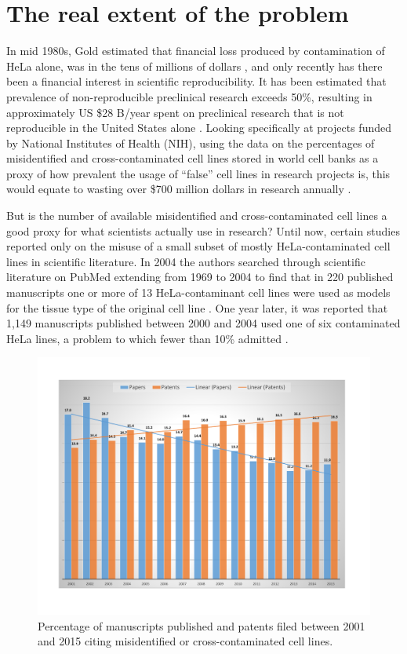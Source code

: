 \documentclass[12pt]{article}
\begin{document}
\section*{The real extent of the problem}

In mid 1980s, Gold estimated that financial loss produced by contamination of HeLa alone, was in the tens of millions of dollars \cite{gold1986conspiracy}, and only recently has there been a financial interest in scientific reproducibility. It has been estimated that prevalence of non-reproducible preclinical research exceeds 50\%, resulting in approximately US \$28 B/year spent on preclinical research that is not reproducible in the United States alone \cite{freedman2015economics}. Looking specifically at projects funded by National Institutes of Health (NIH), using the data on the percentages of misidentified and cross-contaminated cell lines stored in world cell banks as a proxy of how prevalent the usage of ``false'' cell lines in research projects is, this would equate to wasting over \$700 million dollars in research annually \cite{freedman2014culture, freedman2015economics}.

But is the number of available misidentified and cross-contaminated cell lines a good proxy for what scientists actually use in research? Until now, certain studies reported only on the misuse of a small subset of mostly HeLa-contaminated cell lines in scientific literature. In 2004 the authors searched through scientific literature on PubMed extending from 1969 to 2004 to find that in 220 published manuscripts one or more of 13 HeLa-contaminant cell lines were used as models for the tissue type of the original cell line \cite{buehring2004cell}. One year later, it was reported that 1,149 manuscripts published between 2000 and 2004 used one of six contaminated HeLa lines, a problem to which fewer than 10\% admitted \cite{masters2005dna}.

\begin{figure}[b!]
\centering
	\includegraphics[width=.75\textwidth]{Graph.pdf}
	\caption{\label{fig1}Percentage of manuscripts published and patents filed between 2001 and 2015 citing misidentified or cross-contaminated cell lines.}
\end{figure}
\end{document}
